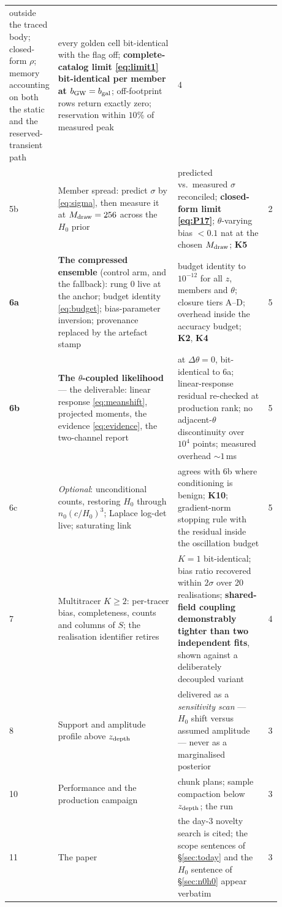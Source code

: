 \documentclass[11pt]{article}
\theoremstyle{definition}
\theoremstyle{remark}
\newcommand{\bgw}{b_{\rm GW}}
\newcommand{\bgal}{b_{\rm gal}}
\newcommand{\zdep}{z_{\rm depth}}
\newcommand{\Mdraw}{M_{\rm draw}}
\begin{document}
\begin{longtable}{@{}p{0.11\linewidth}p{0.44\linewidth}p{0.33\linewidth}r@{}}
outside the traced body; closed-form $\rho$; memory accounting on both the static
and the reserved-transient path &
every golden cell bit-identical with the flag off; \textbf{complete-catalog limit
\eqref{eq:limit1} bit-identical per member at $\bgw=\bgal$}; off-footprint rows
return exactly zero; reservation within $10\%$ of measured peak & 4\\
5b & Member spread: predict $\sigma$ by \eqref{eq:sigma}, then measure it at
$\Mdraw=256$ across the $H_0$ prior &
predicted vs.\ measured $\sigma$ reconciled; \textbf{closed-form limit
\eqref{eq:P17}}; $\theta$-varying bias $<0.1$ nat at the chosen $\Mdraw$;
\textbf{K5} & 2\\
\textbf{6a} & \textbf{The compressed ensemble} (control arm, and the fallback):
rung 0 live at the anchor; budget identity \eqref{eq:budget}; bias-parameter
inversion; provenance replaced by the artefact stamp &
budget identity to $10^{-12}$ for all $z$, members and $\theta$; closure tiers A--D;
overhead inside the accuracy budget; \textbf{K2}, \textbf{K4} & 5\\
\textbf{6b} & \textbf{The $\theta$-coupled likelihood} --- the deliverable: linear
response \eqref{eq:meanshift}, projected moments, the evidence \eqref{eq:evidence},
the two-channel report &
at $\Delta\theta=0$, bit-identical to 6a; linear-response residual re-checked at
production rank; no adjacent-$\theta$ discontinuity over $10^4$ points; measured
overhead $\sim1$\,ms & 5\\
6c & \emph{Optional}: unconditional counts, restoring $H_0$ through
$n_0(c/H_0)^3$; Laplace log-det live; saturating link &
agrees with 6b where conditioning is benign; \textbf{K10}; gradient-norm stopping
rule with the residual inside the oscillation budget & 5\\
7 & Multitracer $K\ge2$: per-tracer bias, completeness, counts and columns of $S$;
the realisation identifier retires &
$K=1$ bit-identical; bias ratio recovered within $2\sigma$ over 20 realisations;
\textbf{shared-field coupling demonstrably tighter than two independent fits}, shown
against a deliberately decoupled variant & 4\\
8 & Support and amplitude profile above $\zdep$ &
delivered as a \emph{sensitivity scan} --- $H_0$ shift versus assumed amplitude ---
never as a marginalised posterior & 3\\
10 & Performance and the production campaign & chunk plans; sample compaction below
$\zdep$; the run & 3\\
11 & The paper & the day-3 novelty search is cited; the scope sentences of
\S\ref{sec:today} and the $H_0$ sentence of \S\ref{sec:n0h0} appear verbatim & 3\\
\bottomrule
\end{longtable}
\end{document}
